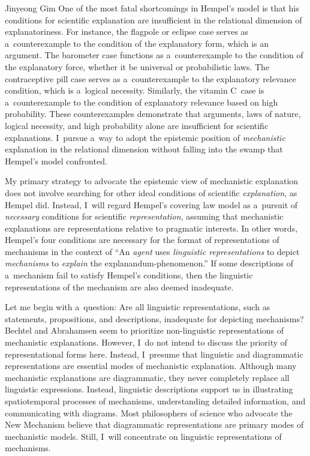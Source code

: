 \begin{artengenv}{Jinyeong Gim}
One of the most fatal shortcomings in Hempel's model is that his conditions for scientific explanation are insufficient in the relational dimension of explanatoriness. For instance, the flagpole or eclipse case serves as a~counterexample to the condition of the explanatory form, which is an argument. The barometer case functions as a~counterexample to the condition of the explanatory force, whether it be universal or probabilistic laws. The contraceptive pill case serves as a~counterexample to the explanatory relevance condition, which is a~logical necessity. Similarly, the vitamin C~case is a~counterexample to the condition of explanatory relevance based on high probability. These counterexamples demonstrate that arguments, laws of nature, logical necessity, and high probability alone are insufficient for scientific explanations. I~pursue a~way to adopt the epistemic position of \textit{mechanistic} explanation in the relational dimension without falling into the swamp that Hempel's model confronted.

My primary strategy to advocate the epistemic view of mechanistic explanation does not involve searching for other ideal conditions of scientific \textit{explanation}, as Hempel did. Instead, I~will regard Hempel's covering law model as a~pursuit of \textit{necessary} conditions for scientific \textit{representation}, assuming that mechanistic explanations are representations relative to pragmatic interests. In other words, Hempel's four conditions are necessary for the format of representations of mechanisms in the context of ``An \textit{agent} uses \textit{linguistic representations} to depict \textit{mechanisms} to \textit{explain} the explanandum-phenomenon.'' If some descriptions of a~mechanism fail to satisfy Hempel's conditions, then the linguistic representations of the mechanism are also deemed inadequate.

Let me begin with a~question: Are all linguistic representations, such as statements, propositions, and descriptions, inadequate for depicting mechanisms? Bechtel and Abrahamsen
\parencite*[][]{bechtel_explanation_2005} %
 seem to prioritize non-linguistic representations of mechanistic explanations. However, I~do not intend to discuss the priority of representational forms here. Instead, I~presume that linguistic and diagrammatic representations are essential modes of mechanistic explanation. Although many mechanistic explanations are diagrammatic, they never completely replace all linguistic expressions. Instead, linguistic descriptions support us in illustrating spatiotemporal processes of mechanisms, understanding detailed information, and communicating with diagrams. Most philosophers of science who advocate the New Mechanism believe that diagrammatic representations are primary modes of mechanistic models. Still, I~will concentrate on linguistic representations of mechanisms.


\end{artengenv}
